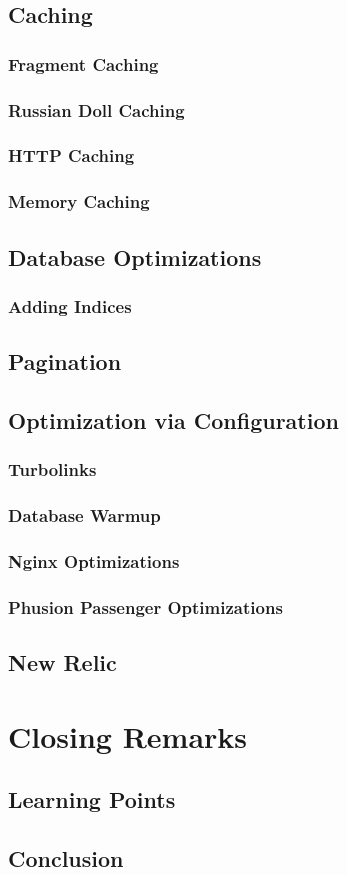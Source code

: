 \documentclass[]{article}
\begin{document}
\subsection{Caching}
\subsubsection{Fragment Caching}
\subsubsection{Russian Doll Caching}
\subsubsection{HTTP Caching}
\subsubsection{Memory Caching}
\subsection{Database Optimizations}
\subsubsection{Adding Indices}
\subsection{Pagination}
\subsection{Optimization via Configuration}
\subsubsection{Turbolinks}
\subsubsection{Database Warmup}
\subsubsection{Nginx Optimizations}
\subsubsection{Phusion Passenger Optimizations}
\subsection{New Relic}
\section{Closing Remarks}
\subsection{Learning Points}
\subsection{Conclusion}
\end{document}
